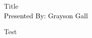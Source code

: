 \documentclass[aspectratio=169, 16pt]{beamer}
\begin{document}
%
%
{
\begin{frame}
  \centering
  \vspace{1.5cm}
	{\huge Title}\\
   \vbox{
    \vspace*{1.5cm}
    \textcolor{black}{\Large Presented By: Grayson Gall}
  }
\end{frame}
}

\begin{frame}{Test}
\end{frame}
\end{document}
